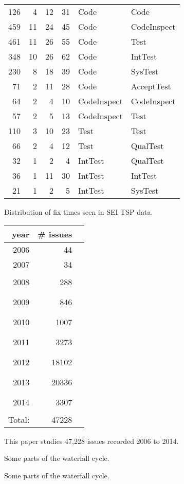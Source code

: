 \documentclass{sig-alternate}
\begin{document}
\begin{figure}[!t]
\begin{center}
\begin{tabular}{r|rrr|ll}
126& 4& 12& 31&  Code&Code\\
459& 11& 24& 45&  Code&CodeInspect\\
461& 11& 26& 55&  Code&Test\\
348& 10& 26& 62&  Code&IntTest\\
230& 8& 18& 39&  Code&SysTest\\
71& 2& 11& 28&  Code&AcceptTest\\\hline

64& 2& 4& 10&  CodeInspect&CodeInspect\\
57& 2& 5& 13&  CodeInspect&Test\\\hline



110& 3& 10& 23&  Test&Test\\
66& 2& 4& 12&  Test&QualTest\\\hline


32& 1& 2& 4&  IntTest&QualTest\\
36& 1& 11& 30&  IntTest&IntTest\\
21& 1& 2& 5&  IntTest&SysTest\\
 \end{tabular}
\end{center}
\caption{Distribution of fix times seen in SEI TSP data.}
\label{fig:faw}
\end{figure}
 
 
\begin{figure}
\begin{center}
\scriptsize
\begin{tabular}{rrl}
year& \# issues&\\\hline
2006 &  44 &\\
2007 &  34 &\\
2008&  288 &\rule{1mm}{2mm}\\
2009&  846 &\rule{3mm}{2mm}\\
2010& 1007 &\rule{3mm}{2mm}\\
2011& 3273 &\rule{10mm}{2mm}\\
2012&18102 &\rule{45mm}{2mm}\\
2013&20336 &\rule{50mm}{2mm}\\
2014& 3307 & \rule{10mm}{2mm}\\\cline{1-2}
Total:&47228
\end{tabular}
\end{center}
\caption{This paper studies 47,228 issues recorded 2006 to 2014.}\label{fig:years}
\end{figure}
\begin{figure*}
\begin{center}
\end{center}
\caption{Some parts of the waterfall cycle.}
\end{figure*}
\begin{figure}
\begin{center}
\end{center}
\caption{Some parts of the waterfall cycle.}
\end{figure}
\end{document}
